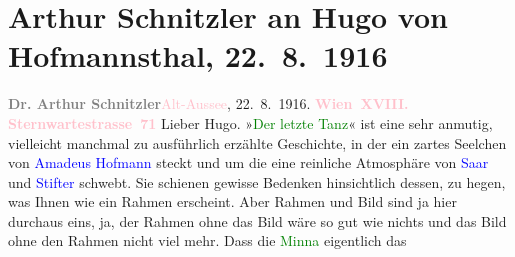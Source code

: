 

               \section[Arthur Schnitzler an Hugo von Hofmannsthal, 22. 8. 1916]{ Arthur Schnitzler an Hugo von Hofmannsthal, 22. 8. 1916}\nopagebreak{}\rehead{ }\normalsize\beginnumbering{} \toendnotes[C]{\smallbreak\pagebreak[2]} 
\toendnotes[C]{\smallbreak}\pstart
           \noindent{}{\pb}\textcolor{gray}{\textbf{Dr. Arthur Schnitzler}}\hfill \textcolor{pink}{Alt-Aussee}{}\ledrightnote{\textcolor{pink}{Altaussee}},
                            22. 8. 1916.\pend
           \pstart
           \textcolor{gray}{\textbf{\textcolor{pink}{Wien XVIII. Sternwartestrasse 71}{}\ledrightnote{\textcolor{pink}{Sternwartestraße}}}}\pend
           \pstart\center{}Lieber Hugo.\pend\pstart
           »\textcolor{green}{Der letzte Tanz}{}\ledrightnote{\textcolor{green}{Der letzte Tanz}}« ist eine sehr anmutig,
                    vielleicht manchmal zu ausführlich erzählte Geschichte, in der ein zartes
                    Seelchen von \textcolor{blue}{Amadeus Hofmann}{}\ledrightnote{\textcolor{blue}{Ernst Theodor Amadeus Hoffmann}} steckt und um
                    die eine reinliche Atmosphäre von \textcolor{blue}{Saar}{}\ledrightnote{\textcolor{blue}{Ferdinand von Saar}} und
                        \textcolor{blue}{Stifter}{}\ledrightnote{\textcolor{blue}{Adalbert Stifter}} schwebt. Sie schienen gewisse
                    Bedenken hinsichtlich dessen, zu hegen, was Ihnen wie ein Rahmen erscheint. Aber
                    Rahmen und Bild sind ja hier durchaus eins, ja, der Rahmen ohne das Bild wäre so
                    gut wie nichts und das Bild ohne den Rahmen nicht viel mehr. Dass die \textcolor{green}{Minna}{} eigentlich das
